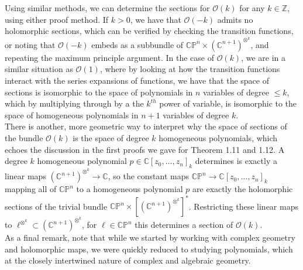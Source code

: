 \documentclass[psamsfonts, 12pt]{amsart}
\theoremstyle{definition}
\theoremstyle{remark}
\renewcommand{\O}{\mathscr{O}}
\newcommand{\Z}{\mathbb{Z}}
\newcommand{\C}{\mathbb{C}}
\newcommand{\CP}{\mathbb{CP}}
\begin{document}
%
Using similar methods, we can determine the sections for $\O(k)$ for any
$k \in \Z$, using either proof method. If $k > 0$, we have that
$\O(-k)$ admits no holomorphic sections, which can be verified by checking the
transition functions, or noting that $\O(-k)$ embeds as a subbundle of
$\CP^n \times (\C^{n+1})^{\otimes^k}$, and repeating the maximum principle argument.
In the case of $\O(k)$, we are in a similar situation as $\O(1)$, where by
looking at how the transition functions interact with the series expansions of
functions, we have that the space of sections is isomorphic to the
space of polynomials in $n$ variables of degree $\leq k$, which by multiplying through
by a the $k^{th}$ power of variable, is isomorphic to the space of homogeneous
polynomials in $n+1$ variables of degree $k$. \\

There is another, more geometric way to interpret why the space of sections of
the bundle $\O(k)$ is the space of degree $k$ homogeneous polynomials, which
echoes the discussion in the first proofs we gave for Theorem 1.11 and 1.12.
A degree $k$ homogeneous polynomial $p \in \C[z_0,\ldots,z_n]_k$ determines is
exactly a linear maps $(\C^{n+1})^{\otimes^k} \to \C$, so the
constant maps $\CP^n \to \C[z_0,\ldots,z_n]_k$ mapping all of $\CP^n$ to a
homogeneous polynomial $p$ are exactly the holomorphic sections of the
trivial bundle $\CP^n \times [(\C^{n+1})^{\otimes^k}]^*$. Restricting
these linear maps to $\ell^{\otimes^k} \subset (\C^{n+1})^{\otimes^k}$, for
$\ell \in \CP^n$ this determines a section of $\O(k)$. \\

As a final remark, note that while we started by working with complex geometry
and holomorphic maps, we were quickly reduced to studying polynomials, which
at the closely intertwined nature of complex and algebraic geometry.
%
\end{document}

